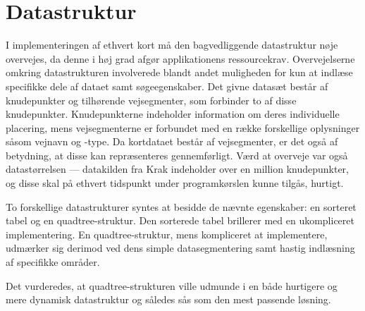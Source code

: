 \section{Datastruktur}
\label{sec:datastruktur}
I implementeringen af ethvert kort må den bagvedliggende datastruktur nøje overvejes, da denne i høj grad afgør applikationens ressourcekrav. Overvejelserne omkring datastrukturen involverede blandt andet muligheden for kun at indlæse specifikke dele af dataet samt søgeegenskaber. Det givne datasæt består af knudepunkter og tilhørende vejsegmenter, som forbinder to af disse knudepunkter. Knudepunkterne indeholder information om deres individuelle placering, mens vejsegmenterne er forbundet med en række forskellige oplysninger såsom vejnavn og -type. Da kortdataet består af vejsegmenter, er det også af betydning, at disse kan repræsenteres gennemførligt. Værd at overveje var også datastørrelsen --- datakilden fra Krak indeholder over en million knudepunkter, og disse skal på ethvert tidspunkt under programkørslen kunne tilgås, hurtigt.

To forskellige datastrukturer syntes at besidde de nævnte egenskaber: en sorteret tabel og en quadtree-struktur. Den sorterede tabel brillerer med en ukompliceret implementering. En quadtree-struktur, mens kompliceret at implementere, udmærker sig derimod ved dens simple datasegmentering samt hastig indlæsning af specifikke områder. 

Det vurderedes, at quadtree-strukturen ville udmunde i en både hurtigere og mere dynamisk datastruktur og således sås som den mest passende løsning.
